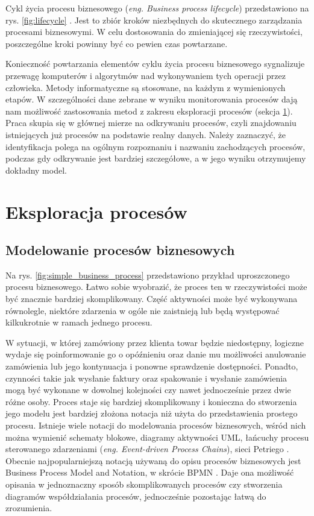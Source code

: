 Cykl życia procesu biznesowego (\textit{eng. Business process lifecycle}) przedstawiono na rys. \ref{fig:lifecycle} \cite{dumas2013fundamentals}. Jest to zbiór kroków niezbędnych do skutecznego zarządzania procesami biznesowymi. W celu dostosowania do zmieniającej się rzeczywistości, poszczególne kroki powinny być co pewien czas powtarzane. 

Konieczność powtarzania elementów cyklu życia procesu biznesowego sygnalizuje przewagę komputerów i algorytmów nad wykonywaniem tych operacji przez człowieka. Metody informatyczne są stosowane, na każdym z wymienionych etapów. W szczególności dane zebrane w wyniku monitorowania procesów dają nam możliwość zastosowania metod z zakresu eksploracji procesów (sekcja \ref{sec:eksploracja}). Praca skupia się w głównej mierze na odkrywaniu procesów, czyli znajdowaniu istniejących już procesów na podstawie realny danych. Należy zaznaczyć, że identyfikacja polega na ogólnym rozpoznaniu i nazwaniu zachodzących procesów, podczas gdy odkrywanie jest bardziej szczegółowe, a w jego wyniku otrzymujemy dokładny model.  


\section{Eksploracja procesów}
\label{sec:eksploracja}
\subsection{Modelowanie procesów biznesowych}
Na rys. \ref{fig:simple_business_process} przedstawiono przykład uproszczonego procesu biznesowego. Łatwo sobie wyobrazić, że proces ten w rzeczywistości może być znacznie bardziej skomplikowany. Część aktywności może być wykonywana równolegle, niektóre zdarzenia w ogóle nie zaistnieją lub będą występować kilkukrotnie w ramach jednego procesu. 


W sytuacji, w której zamówiony przez klienta towar będzie niedostępny, logiczne wydaje się poinformowanie go o opóźnieniu oraz danie mu możliwości anulowanie zamówienia lub jego kontynuacja i ponowne sprawdzenie dostępności. Ponadto, czynności takie jak wysłanie faktury oraz spakowanie i wysłanie zamówienia mogą być wykonane w dowolnej kolejności czy nawet jednocześnie przez dwie różne osoby. Proces staje się bardziej skomplikowany i konieczna do stworzenia jego modelu jest bardziej złożona notacja niż użyta do przedstawienia prostego procesu. 
Istnieje wiele notacji do modelowania procesów biznesowych, wśród nich można wymienić schematy blokowe, diagramy aktywności UML, łańcuchy procesu sterowanego zdarzeniami (\textit{eng. Event-driven Process Chains}), sieci Petriego \cite{BPMComparission}. Obecnie najpopularniejszą notacją używaną do opisu procesów biznesowych jest Business Process  Model and Notation, w skrócie BPMN \cite{omg2011bpmn}. Daje ona możliwość opisania w jednoznaczny sposób skomplikowanych procesów czy stworzenia diagramów współdziałania procesów, jednocześnie pozostając łatwą do zrozumienia.

